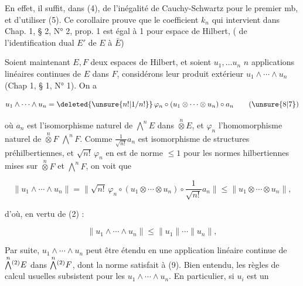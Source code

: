 En effet, il suffit, dans (4), de  l'inégalité de
Cauchy-Schwartz pour le premier mb, et d'utiliser (5).
Ce corollaire prouve que le coefficient $k_n$ qui intervient
dans Chap. 1, § 2, N° 2, prop. 1 est égal à 1 pour   espace de
Hilbert, (  de l'identification  dual $E'$ de $E$ à $\bar E$)

Soient maintenant $E,F$ deux espaces de Hilbert, et
soient $u_1,\ldots u_n$ $n$ applications linéaires continues
de $E$ dans $F$, considérons leur produit extérieur
$u_1\wedge\cdots\wedge u_n$ (Chap 1, § 1, N° 1). On a

\[
u_1\wedge\cdots\wedge u_n=\deleted{\unsure{n!|1/n!}}\,\varphi_n\circ(u_1\otimes\cdots\otimes u_n)\circ a_n \tag*{(\unsure{8|7})}
\]

où $a_n$ est l'isomorphisme  naturel de
$\overset{n}{\bigwedge}E$ dans $\overset{n}{\otimes}E$, et $\varphi_n$ l'homomorphisme naturel de
$\overset{n}{\otimes}F$   $\overset{n}{\bigwedge}F$. Comme $\frac1{\sqrt{n!}}a_n$ est 
isomorphisme de structures préhilbertiennes, et $\sqrt{n!}\,\varphi_n$ en est
de norme $\leq1$ pour les normes hilbertiennes mises
sur $\overset{n}{\otimes}F$ et $\overset{n}{\bigwedge}F$, on voit que

\[
\|u_1\wedge\cdots\wedge u_n\|=\|\sqrt{n!}\,\varphi_n\circ(u_1\otimes\cdots\otimes u_n)\circ\frac1{\sqrt{n!}}a_n\|\leq\|u_1\otimes\cdots\otimes u_n\|,
\]

d'où, en vertu de (2) :

\[
\|u_1\wedge\cdots\wedge u_n\|\leq\|u_1\|\cdots\|u_n\|, \tag*{(9)}
\]

Par suite, $u_1\wedge\cdots\wedge u_n$ peut être étendu en
une application linéaire continue de $\overset{n}{\bigwedge}\vphantom{\bigwedge}^{(2)}E$ dans
$\overset{n}{\bigwedge}\vphantom{\bigwedge}^{(2)}F$,  dont la norme satisfait à (9). Bien entendu,
les règles de calcul usuelles subsistent pour les
 $u_1\wedge\cdots\wedge u_n$.  En particulier, si $u_i$ est un

